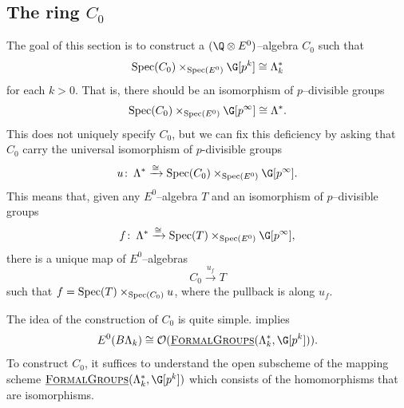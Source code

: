 \subsection*{The ring \(C_0\)}


The goal of this section is to construct a \((\Q \otimes E^0)\)--algebra \(C_0\) such that
\[
\Spec(C_0) \times_{\Spec(E^0)} \G[p^k] \cong \Lambda_{k}^*
\]
for each \(k>0\).
That is, there should be an isomorphism of \(p\)--divisible groups
\[
\Spec(C_0) \times_{\Spec(E^0)} \G[p^\infty] \cong \Lambda^*.
\]
This does not uniquely specify \(C_0\), but we can fix this deficiency by asking that \(C_0\) carry the universal isomorphism of \(p\)-divisible groups 
\[
u \co \Lambda^* \xrightarrow{\cong} \Spec(C_0) \times_{\Spec(E^0)} \G[p^\infty].
\]
This means that, given any \(E^0\)--algebra \(T\) and an isomorphism of \(p\)--divisible groups
\[
f \co \Lambda^* \xrightarrow{\cong} \Spec(T) \times_{\Spec(E^0)} \G[p^\infty],
\]
there is a unique map of \(E^0\)--algebras
\[
C_0 \xrightarrow{u_f} T
\]
such that \(f = \operatorname{Spec}(T) \times_{\operatorname{Spec}(C_0)} u\), where the pullback is along \(u_f\).

The idea of the construction of \(C_0\) is quite simple.
 implies \[E^0(B\Lk) \cong \sheaf O(\InternalHom{FormalGroups}(\Lk^*,\G[p^k])).\]  To construct \(C_0\), it suffices to understand the open subscheme of the mapping scheme \(\InternalHom{FormalGroups}(\Lk^*,\G[p^k])\) which consists of the homomorphisms that are isomorphisms.

